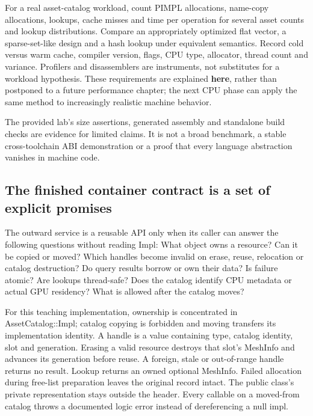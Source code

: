For a real asset-catalog workload, count PIMPL allocations, name-copy allocations, lookups, cache misses and time per operation for several asset counts and lookup distributions. Compare an appropriately optimized flat vector, a sparse-set-like design and a hash lookup under equivalent semantics. Record cold versus warm cache, compiler version, flags, CPU type, allocator, thread count and variance. Profilers and disassemblers are instruments, not substitutes for a workload hypothesis. These requirements are explained \textbf{here}, rather than postponed to a future performance chapter; the next CPU phase can apply the same method to increasingly realistic machine behavior.

The provided lab's size assertions, generated assembly and standalone build checks are evidence for limited claims. It is not a broad benchmark, a stable cross-toolchain ABI demonstration or a proof that every language abstraction vanishes in machine code.

\subsection{The finished container contract is a set of explicit promises}\label{05-engine-i-ch007-the-finished-container-contract-is-a-set-of-explicit-promises}

The outward service is a reusable API only when its caller can answer the following questions without reading Impl: What object owns a resource? Can it be copied or moved? Which handles become invalid on erase, reuse, relocation or catalog destruction? Do query results borrow or own their data? Is failure atomic? Are lookups thread-safe? Does the catalog identify CPU metadata or actual GPU residency? What is allowed after the catalog moves?

For this teaching implementation, ownership is concentrated in AssetCatalog::Impl; catalog copying is forbidden and moving transfers its implementation identity. A handle is a value containing type, catalog identity, slot and generation. Erasing a valid resource destroys that slot's MeshInfo and advances its generation before reuse. A foreign, stale or out-of-range handle returns no result. Lookup returns an owned optional MeshInfo. Failed allocation during free-list preparation leaves the original record intact. The public class's private representation stays outside the header. Every callable on a moved-from catalog throws a documented logic error instead of dereferencing a null impl.

